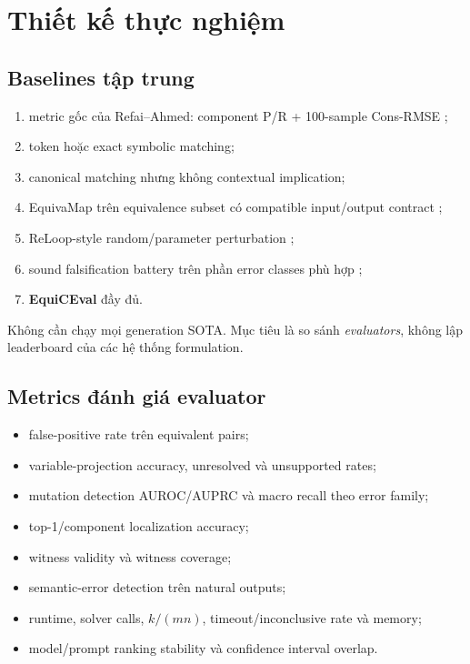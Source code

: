 \documentclass[11pt,a4paper]{article}
\newcommand{\method}{\textsf{\textbf{EquiCEval}}\xspace}
\begin{document}
\section{Thiết kế thực nghiệm}

\subsection{Baselines tập trung}

\begin{enumerate}
  \item metric gốc của Refai--Ahmed: component P/R + 100-sample Cons-RMSE
  \parencite{refai2025component};
  \item token hoặc exact symbolic matching;
  \item canonical matching nhưng không contextual implication;
  \item EquivaMap trên equivalence subset có compatible input/output contract
  \parencite{zhai2025equivamap};
  \item ReLoop-style random/parameter perturbation
  \parencite{lian2026reloop};
  \item sound falsification battery trên phần error classes phù hợp
  \parencite{li2026falsification};
  \item \method đầy đủ.
\end{enumerate}

Không cần chạy mọi generation SOTA. Mục tiêu là so sánh \emph{evaluators}, không
lập leaderboard của các hệ thống formulation.

\subsection{Metrics đánh giá evaluator}

\begin{itemize}
  \item false-positive rate trên equivalent pairs;
  \item variable-projection accuracy, unresolved và unsupported rates;
  \item mutation detection AUROC/AUPRC và macro recall theo error family;
  \item top-1/component localization accuracy;
  \item witness validity và witness coverage;
  \item semantic-error detection trên natural outputs;
  \item runtime, solver calls, \(k/(mn)\), timeout/inconclusive rate và memory;
  \item model/prompt ranking stability và confidence interval overlap.
\end{itemize}
\end{document}
